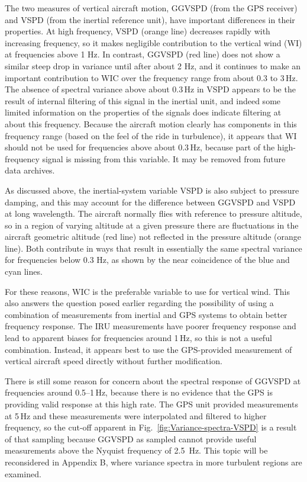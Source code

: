 \documentclass[12pt,twoside,english]{article}\usepackage[]{graphicx}\usepackage[]{color}
\let\OrgIndex\index
\renewcommand*{\index}[1]{\OrgIndex{#1}}
\begin{document}
{{The two measures of vertical aircraft motion, GGVSPD (from the GPS receiver) and VSPD (from the inertial reference unit), have important differences in their properties. At high frequency, VSPD (orange line) decreases rapidly with increasing frequency, so it makes negligible contribution to the vertical wind (WI) at frequencies above 1 Hz. In contrast, GGVSPD (red line) does not show a similar steep drop in variance until after about 2 Hz, and it continues to make an important contribution to WIC over the frequency range from about 0.3 to 3\,Hz. The absence of spectral variance above about 0.3\,Hz in VSPD appears to be the result of internal filtering of this signal in the inertial unit, and indeed some limited information on the properties of the signals does indicate filtering at about this frequency. Because the aircraft motion clearly has components in this frequency range (based on the feel of the ride in turbulence), it appears that WI should not be used for frequencies above about 0.3\,Hz, because part of the high-frequency signal is missing from this variable. It may be removed from future data archives.

As discussed above, the inertial-system variable VSPD is also subject to pressure damping, and this may account for the difference between GGVSPD and VSPD at long wavelength. The aircraft normally flies with reference to pressure altitude, so in a region of varying altitude at a given pressure there are fluctuations in the aircraft geometric altitude (red line) not reflected in the pressure altitude (orange line). Both contribute in ways that result in essentially the same spectral variance for frequencies below 0.3 Hz, as shown by the near coincidence of the blue and cyan lines.

For these reasons, WIC is the preferable variable to use for vertical wind. This also answers the question posed earlier regarding the possibility of using a combination of measurements from inertial and GPS systems to obtain better frequency response. The IRU measurements have poorer frequency response and lead to apparent biases for frequencies around 1\,Hz, so this is not a useful combination. Instead, it appears best to use the GPS-provided measurement of vertical aircraft speed directly without further modification. 

There is still some reason for concern about the spectral response of GGVSPD at frequencies around 0.5--1\,Hz, because there is no evidence that the GPS is providing valid response at this high rate. The GPS unit provided measurements at 5\,Hz and these measurements were interpolated and filtered to higher frequency, so the cut-off apparent in Fig.~\ref{fig:Variance-spectra-VSPD} is a result of that sampling because GGVSPD as sampled cannot provide useful measurements above the Nyquist frequency of 2.5~Hz. This topic will be reconsidered in Appendix B, where variance spectra in more turbulent regions are examined. 

}}
\end{document}
